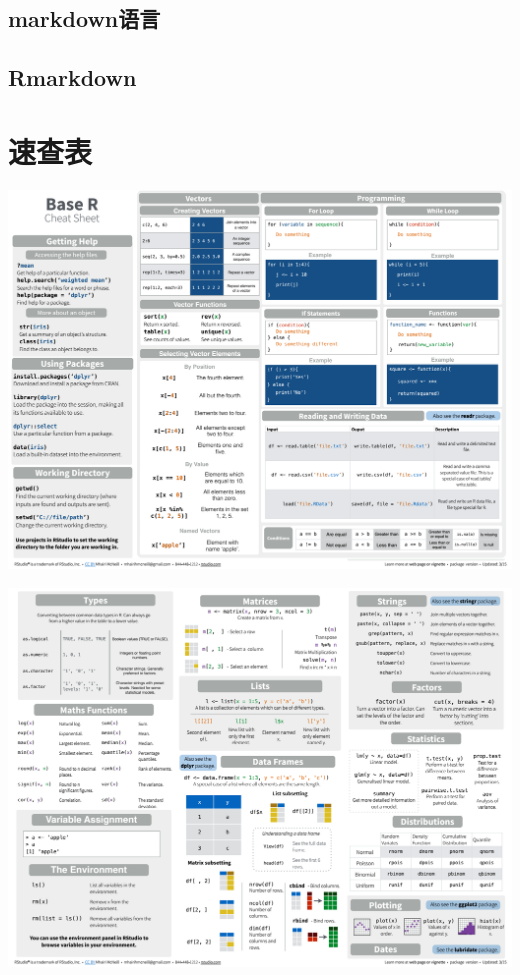 \documentclass[]{book}
\begin{document}
\hypertarget{markdown}{%
\section{markdown语言}\label{markdown}}

\hypertarget{rmarkdown}{%
\section{Rmarkdown}\label{rmarkdown}}

\hypertarget{section-30}{%
\chapter{速查表}\label{section-30}}

\includegraphics{figures/cheatsheet1.png}

\includegraphics{figures/cheatsheet2.png}


\end{document}
